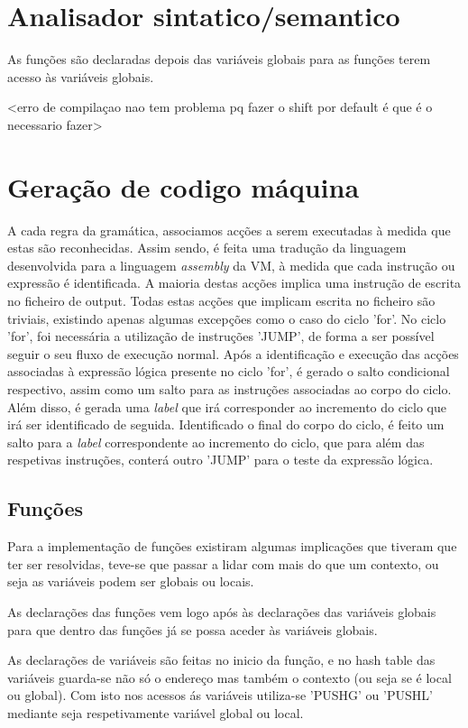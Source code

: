 \documentclass[a4paper,10pt]{report}
\begin{document}
\section{Analisador sintatico/semantico}

As funções são declaradas depois das variáveis globais para as funções terem acesso às variáveis globais.

<erro de compilaçao nao tem problema pq fazer o shift por default é que é o necessario fazer>


\section{Geração de codigo máquina}
    A cada regra da gramática, associamos acções a serem executadas à medida que estas são reconhecidas. Assim sendo, é feita uma tradução da linguagem desenvolvida para a linguagem \emph{assembly} da VM, à medida que cada instrução ou expressão é identificada. A maioria destas acções implica uma instrução de escrita no ficheiro de output. Todas estas acções que implicam escrita no ficheiro são triviais, existindo apenas algumas excepções como o caso do ciclo 'for'.
	No ciclo 'for', foi necessária a utilização de instruções 'JUMP', de forma a ser possível seguir o seu fluxo de execução normal. Após a identificação e execução das acções associadas à expressão lógica presente no ciclo 'for', é gerado o salto condicional respectivo, assim como um salto para as instruções associadas ao corpo do ciclo. Além disso, é gerada uma \emph{label} que irá corresponder ao incremento do ciclo que irá ser identificado de seguida. Identificado o final do corpo do ciclo, é feito um salto para a \emph{label} correspondente ao incremento do ciclo, que para além das respetivas instruções, conterá outro 'JUMP' para o teste da expressão lógica.

\subsection{Funções}

Para a implementação de funções existiram algumas implicações que tiveram que ter ser resolvidas, teve-se que passar a lidar com mais do que um contexto, ou seja as variáveis podem ser globais ou locais.

As declarações das funções vem logo após às declarações das variáveis globais para que dentro das funções já se possa aceder às variáveis globais.

As declarações de variáveis são feitas no inicio da função, e no hash table das variáveis guarda-se não só o endereço mas também o contexto (ou seja se é local ou global). Com isto nos acessos ás variáveis utiliza-se 'PUSHG' ou 'PUSHL' mediante seja respetivamente variável global ou local.
\end{document}
